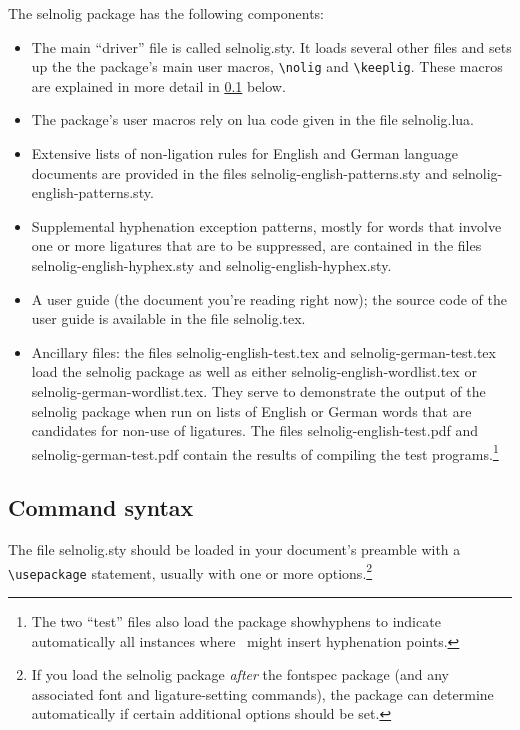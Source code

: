 \documentclass[12pt]{article}
\newcommand{\pkg}[1]{\textsf{#1}}
\newcommand{\cmmd}[1]{\texttt{\textbackslash #1}}
\begin{document}
The \pkg{selnolig} package has the following components:
\begin{itemize}
\item The main \enquote{driver} file is called  \pkg{selnolig.sty}. It loads several other files and sets up the the package's main user macros, \cmmd{nolig} and \cmmd{keeplig}. These macros are explained in more detail in \cref{sec:syntax} below.
\item The package's user macros rely on lua code given in the file \pkg{selnolig.lua}. 
\item Extensive lists of non-ligation rules for English and German language documents are provided in the files \pkg{selnolig-english-patterns.sty} and \pkg{selnolig-english-patterns.sty}. 
\item Supplemental hyphenation exception patterns, mostly for words that involve one or more ligatures that are to be suppressed, are contained in the files \pkg{selnolig-english-hyphex.sty} and \pkg{selnolig-english-hyphex.sty}.
\item A user guide (the document you're reading right now); the source code of the user guide is available in the file \pkg{selnolig.tex}. 

\item Ancillary files: the files \pkg{selnolig-english-test.tex} and \pkg{selnolig-german-test.tex} load the \pkg{selnolig} package as well as either \pkg{selnolig-english-wordlist.tex} or \pkg{selnolig-german-wordlist.tex}. They serve to demonstrate the output of the \pkg{selnolig} package when run on lists of English or German words that are candidates for non-use of ligatures. The files \pkg{selnolig-english-test.pdf} and \pkg{selnolig-german-test.pdf} contain the results of compiling the test programs.\footnote{The two \enquote{test} files also load the package \pkg{showhyphens} to indicate automatically all instances where \LuaLaTeX\ might insert hyphenation points.}

\end{itemize}


\subsection{Command syntax} \label{sec:syntax}

The file \pkg{selnolig.sty} should be loaded in your document's preamble with a \cmmd{usepackage} statement, usually with one or more options.\footnote{If you load the \pkg{selnolig} package \emph{after} the \pkg{fontspec} package (and any associated font and ligature-setting commands), the package can determine automatically if certain additional options should be set.}
\end{document}
